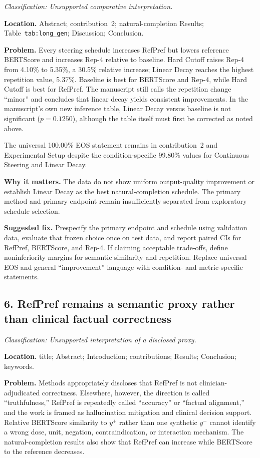 \documentclass[11pt]{article}
\newcommand{\findinglabel}[1]{\textbf{#1}}
\newcommand{\classification}[1]{\textit{Classification: #1.}}
\begin{document}
\classification{Unsupported comparative interpretation}

\findinglabel{Location.} Abstract; contribution~2; natural-completion Results; Table~\texttt{tab:long\_gen}; Discussion; Conclusion.

\findinglabel{Problem.} Every steering schedule increases RefPref but lowers reference BERTScore and increases Rep-4 relative to baseline.  Hard Cutoff raises Rep-4 from 4.10\% to 5.35\%, a 30.5\% relative increase; Linear Decay reaches the highest repetition value, 5.37\%.  Baseline is best for BERTScore and Rep-4, while Hard Cutoff is best for RefPref.  The manuscript still calls the repetition change ``minor'' and concludes that linear decay yields consistent improvements.  In the manuscript's own new inference table, Linear Decay versus baseline is not significant ($p=0.1250$), although the table itself must first be corrected as noted above.

The universal 100.00\% EOS statement remains in contribution~2 and Experimental Setup despite the condition-specific 99.80\% values for Continuous Steering and Linear Decay.

\findinglabel{Why it matters.} The data do not show uniform output-quality improvement or establish Linear Decay as the best natural-completion schedule.  The primary method and primary endpoint remain insufficiently separated from exploratory schedule selection.

\findinglabel{Suggested fix.} Prespecify the primary endpoint and schedule using validation data, evaluate that frozen choice once on test data, and report paired CIs for RefPref, BERTScore, and Rep-4.  If claiming acceptable trade-offs, define noninferiority margins for semantic similarity and repetition.  Replace universal EOS and general ``improvement'' language with condition- and metric-specific statements.

\subsection*{6. RefPref remains a semantic proxy rather than clinical factual correctness}

\classification{Unsupported interpretation of a disclosed proxy}

\findinglabel{Location.} title; Abstract; Introduction; contributions; Results; Conclusion; keywords.

\findinglabel{Problem.} Methods appropriately discloses that RefPref is not clinician-adjudicated correctness.  Elsewhere, however, the direction is called ``truthfulness,'' RefPref is repeatedly called ``accuracy'' or ``factual alignment,'' and the work is framed as hallucination mitigation and clinical decision support.  Relative BERTScore similarity to $y^+$ rather than one synthetic $y^-$ cannot identify a wrong dose, unit, negation, contraindication, or interaction mechanism.  The natural-completion results also show that RefPref can increase while BERTScore to the reference decreases.
\end{document}
